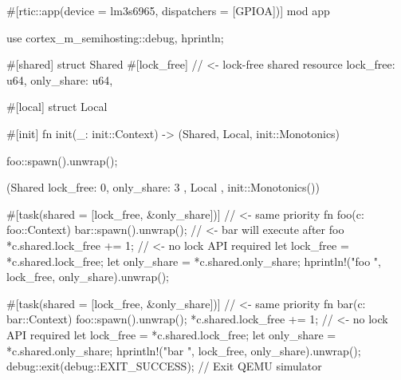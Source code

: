 #[rtic::app(device = lm3s6965, dispatchers = [GPIOA])]
mod app {
    use cortex_m_semihosting::{debug, hprintln};

    #[shared]
    struct Shared {
        #[lock_free] // <- lock-free shared resource
        lock_free: u64,
        only_share: u64,
    }

    #[local]
    struct Local {}

    #[init]
    fn init(_: init::Context) -> (Shared, Local, init::Monotonics) {
        foo::spawn().unwrap();

        (Shared { lock_free: 0, only_share: 3 }, Local {}, init::Monotonics())
    }

    #[task(shared = [lock_free, &only_share])] // <- same priority
    fn foo(c: foo::Context) {
        bar::spawn().unwrap();  // <- bar will execute after foo
        *c.shared.lock_free += 1; // <- no lock API required
        let lock_free = *c.shared.lock_free;
        let only_share = *c.shared.only_share;
        hprintln!("foo {} {}", lock_free, only_share).unwrap();
    }

    #[task(shared = [lock_free, &only_share])] // <- same priority
    fn bar(c: bar::Context) {
        foo::spawn().unwrap();
        *c.shared.lock_free += 1; // <- no lock API required
        let lock_free = *c.shared.lock_free;
        let only_share = *c.shared.only_share;
        hprintln!("bar {} {}", lock_free, only_share).unwrap();
        debug::exit(debug::EXIT_SUCCESS); // Exit QEMU simulator
    }
}
